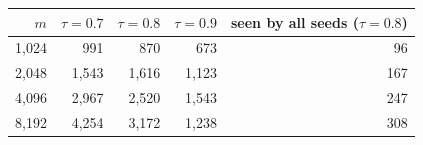 \begin{tabular}{rrrrr}
\toprule
$m$ & $\tau=0.7$ & $\tau=0.8$ & $\tau=0.9$ & seen by all seeds ($\tau=0.8$) \\
\midrule
1{,}024 & 991 & 870 & 673 & 96 \\
2{,}048 & 1{,}543 & 1{,}616 & 1{,}123 & 167 \\
4{,}096 & 2{,}967 & 2{,}520 & 1{,}543 & 247 \\
8{,}192 & 4{,}254 & 3{,}172 & 1{,}238 & 308 \\
\bottomrule
\end{tabular}
